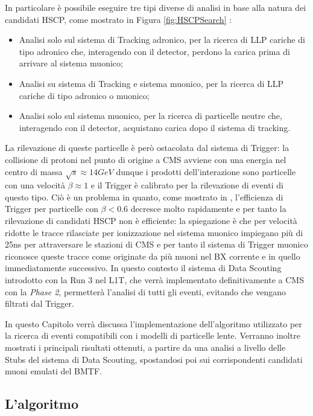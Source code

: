 In particolare è possibile eseguire tre tipi diverse di analisi in base alla natura dei candidati HSCP, come mostrato in Figura \ref{fig:HSCPSearch} \cite{MasterThesisGioMoc}: 
\begin{itemize}
   \item Analisi solo sul sistema di Tracking adronico, per la ricerca di LLP cariche di tipo adronico che, interagendo con il detector, perdono la carica prima di arrivare al sistema muonico;
   \item Analisi su sistema di Tracking e sistema muonico, per la ricerca di LLP cariche di tipo adronico o muonico;
   \item Analisi solo sul sistema muonico, per la ricerca di particelle neutre che, interagendo con il detector, acquistano carica dopo il sistema di tracking.
\end{itemize}

La rilevazione di queste particelle è però ostacolata dal sistema di Trigger: la collisione di protoni nel punto di origine a CMS avviene con una energia nel centro di massa $\sqrt{s} \approx 14 \si{GeV}$ dunque i prodotti dell'interazione sono particelle con una velocità $\beta \approx 1$ e il Trigger è calibrato per la rilevazione di eventi di questo tipo. Ciò è un problema in quanto, come mostrato in \cite{MasterThesisGioMoc}, l'efficienza di Trigger per particelle con $\beta < 0.6$ decresce molto rapidamente e per tanto la rilevazione di candidati HSCP non è efficiente: la spiegazione è che per velocità ridotte le tracce rilasciate per ionizzazione nel sistema muonico impiegano più di 25ns per attraversare le stazioni di CMS e per tanto il sistema di Trigger muonico riconosce queste tracce come originate da più muoni nel BX corrente e in quello immediatamente successivo. \newline
In questo contesto il sistema di Data Scouting introdotto con la Run 3 nel L1T, che verrà implementato definitivamente a CMS con la \textit{Phase 2}, permetterà l'analisi di tutti gli eventi, evitando che vengano filtrati dal Trigger.

In questo Capitolo verrà discussa l'implementazione dell'algoritmo utilizzato per la ricerca di eventi compatibili con i modelli di particelle lente. Verranno inoltre mostrati i principali risultati ottenuti, a partire da una analisi a livello delle Stubs del sistema di Data Scouting, spostandosi poi sui corrispondenti candidati muoni emulati del BMTF.

\subsection{L'algoritmo}

